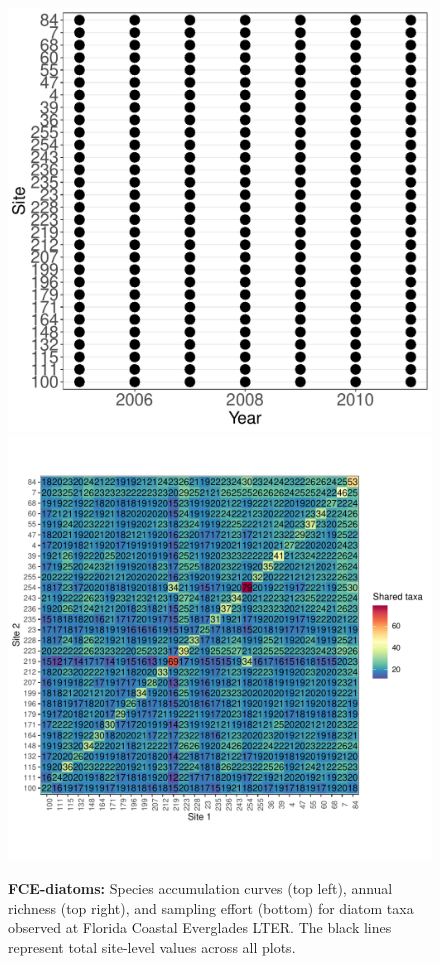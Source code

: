 \documentclass[11pt, oneside]{article}
\begin{document}
\begin{figure}[h!]
\includegraphics[scale = 0.4]{fce-diatoms-catano_spatiotemporal_sampling_effort.pdf}
\includegraphics[scale = 0.4]{fce-diatoms-catano_spp_shared.pdf}
\caption{{\bf FCE-diatoms:} Species accumulation curves (top left),  annual richness (top right), and sampling effort (bottom)  for diatom taxa observed at  Florida Coastal Everglades LTER. The black lines represent total site-level values across all plots.}
\label{fce-diatoms}
\end{figure}
\end{document}

